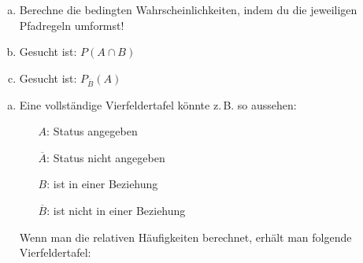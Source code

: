 \begin{exercise}
\begin{enumerate}[a)]
\begin{center}
\begin{fourfoldtable}
              \end{fourfoldtable}
            \end{center}
      \item Berechne die bedingten Wahrscheinlichkeiten, indem du die
            jeweiligen Pfadregeln umformst!
      \item Gesucht ist: $P(A\cap B)$
      \item Gesucht ist: $P_{\overline{B}}(A)$
    \end{enumerate}
  \fi
  \ifoutcome\outcome\par
    \begin{enumerate}[a)]
      \item Eine vollständige Vierfeldertafel könnte z.\,B. so aussehen:
            \begin{center}
              \begin{minipage}{0.36\linewidth}
                \begin{itemize}
                  \setlength{\leftskip}{0pt}%
                  \setlength{\itemsep}{-0.1\baselineskip}%
                  \item[$A$:]            Status angegeben
                  \item[$\overline{A}$:] Status nicht angegeben
                  \item[$B$:]            ist in einer Beziehung
                  \item[$\overline{B}$:] ist nicht in einer Beziehung
                \end{itemize}
              \end{minipage}
              \qquad
              \begin{fourfoldtable}
              \end{fourfoldtable}
            \end{center}
             Wenn man die relativen Häufigkeiten berechnet, erhält man
             folgende Vierfeldertafel:
             \begin{center}
               \begin{fourfoldtable}

\end{fourfoldtable}
\end{center}
\end{enumerate}
\end{exercise}
